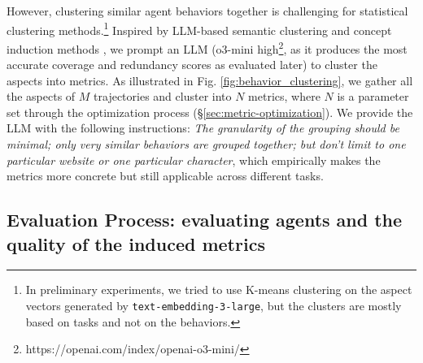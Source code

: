 However, clustering similar agent behaviors together is challenging for statistical
clustering methods.\footnote{ In preliminary experiments, we tried to use K-means
	clustering on the aspect vectors generated by \texttt{text-embedding-3-large},
	but the clusters are mostly based on tasks and not on the behaviors. } Inspired by
LLM-based semantic clustering and concept induction methods \citet{viswanathan2024large,lam2024concept},
we prompt an LLM (o3-mini high\footnote{https://openai.com/index/openai-o3-mini/},
as it produces the most accurate coverage and redundancy scores as evaluated
later) to cluster the aspects into metrics. As illustrated in Fig. \ref{fig:behavior_clustering},
we gather all the aspects of $M$ trajectories and cluster into $N$ metrics, where
$N$ is a parameter set through the optimization process (\S\ref{sec:metric-optimization}).
We provide the LLM with the following instructions: \emph{The granularity of the
	grouping should be minimal; only very similar behaviors are grouped together;
	but don't limit to one particular website or one particular character}, which
empirically makes the metrics more concrete but still applicable across
different tasks.

\subsection{Evaluation Process: evaluating agents and the quality of the induced
	metrics}
\label{sec:evaluation_process}

